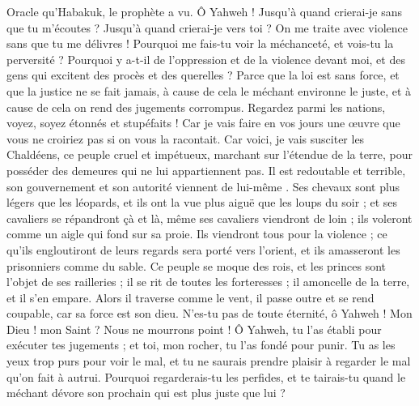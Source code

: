 \begin{multicols}{2}
\VerseOne{}Oracle qu’Habakuk, le prophète a vu.
Ô Yahweh ! Jusqu’à quand crierai-je sans que tu m'écoutes ? Jusqu'à quand crierai-je vers toi ? On me traite avec violence sans que tu me délivres !
Pourquoi me fais-tu voir la méchanceté, et vois-tu la perversité ? Pourquoi y a-t-il de l’oppression et de la violence devant moi, et des gens qui excitent des procès et des querelles ?
Parce que la loi est sans force, et que la justice ne se fait jamais, à cause de cela le méchant environne le juste, et à cause de cela on rend des jugements corrompus.
Regardez parmi les nations, voyez, soyez étonnés et stupéfaits ! Car je vais faire en vos jours une œuvre que vous ne croiriez pas si on vous la racontait.
Car voici, je vais susciter les Chaldéens, ce peuple cruel et impétueux, marchant sur l'étendue de la terre, pour posséder des demeures qui ne lui appartiennent pas.
Il est redoutable et terrible, son gouvernement et son autorité viennent de lui-même .
Ses chevaux sont plus légers que les léopards, et ils ont la vue plus aiguë que les loups du soir ; et ses cavaliers se répandront çà et là, même ses cavaliers viendront de loin ; ils voleront comme un aigle qui fond sur sa proie.
Ils viendront tous pour la violence ; ce qu'ils engloutiront de leurs regards sera porté vers l'orient, et ils amasseront les prisonniers comme du sable.
Ce peuple se moque des rois, et les princes sont l’objet de ses railleries ; il se rit de toutes les forteresses ; il amoncelle de la terre, et il s’en empare.
Alors il traverse comme le vent, il passe outre et se rend coupable, car sa force est son dieu.
N'es-tu pas de toute éternité, ô Yahweh ! Mon Dieu ! mon Saint ? Nous ne mourrons point ! Ô Yahweh, tu l'as établi pour exécuter tes jugements ; et toi, mon rocher, tu l'as fondé pour punir.
Tu as les yeux trop purs pour voir le mal, et tu ne saurais prendre plaisir à regarder le mal qu'on fait à autrui. Pourquoi regarderais-tu les perfides, et te tairais-tu quand le méchant dévore son prochain qui est plus juste que lui ?

\end{multicols}
